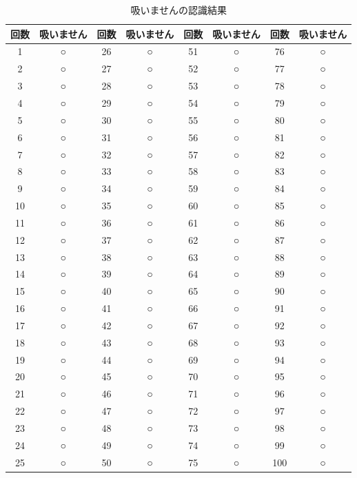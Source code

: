 \documentclass[12pt,oneside]{sotsuken_paper}
\begin{document}
\begin{table}[htb]
\begin{center}
\caption{吸いませんの認識結果}
\begin{tabular}{|c|c|c|c|c|c|c|c|}\hline
回数&吸いません&回数&吸いません&回数&吸いません&回数&吸いません\\\hline
1&○&26&○&51&○&76&○\\\hline
2&○&27&○&52&○&77&○\\\hline
3&○&28&○&53&○&78&○\\\hline
4&○&29&○&54&○&79&○\\\hline
5&○&30&○&55&○&80&○\\\hline
6&○&31&○&56&○&81&○\\\hline
7&○&32&○&57&○&82&○\\\hline
8&○&33&○&58&○&83&○\\\hline
9&○&34&○&59&○&84&○\\\hline
10&○&35&○&60&○&85&○\\\hline
11&○&36&○&61&○&86&○\\\hline
12&○&37&○&62&○&87&○\\\hline
13&○&38&○&63&○&88&○\\\hline
14&○&39&○&64&○&89&○\\\hline
15&○&40&○&65&○&90&○\\\hline
16&○&41&○&66&○&91&○\\\hline
17&○&42&○&67&○&92&○\\\hline
18&○&43&○&68&○&93&○\\\hline
19&○&44&○&69&○&94&○\\\hline
20&○&45&○&70&○&95&○\\\hline
21&○&46&○&71&○&96&○\\\hline
22&○&47&○&72&○&97&○\\\hline
23&○&48&○&73&○&98&○\\\hline
24&○&49&○&74&○&99&○\\\hline
25&○&50&○&75&○&100&○
\\\hline
\end{tabular}
\label{tab:nonsmokrecogresult}
\end{center}
\end{table}
\end{document}
